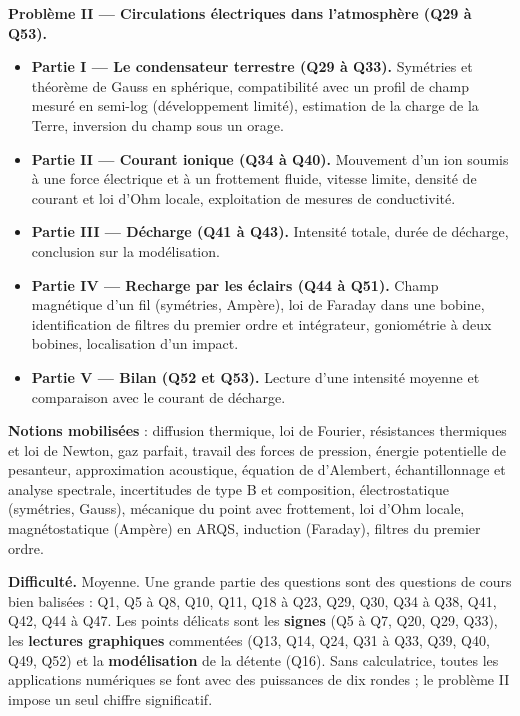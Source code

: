 \documentclass[11pt,a4paper]{article}
\providecommand{\tightlist}{\setlength{\itemsep}{0pt}\setlength{\parskip}{0pt}}
\begin{document}
\textbf{Problème II --- Circulations électriques dans l'atmosphère (Q29 à Q53).}

\begin{itemize}
\tightlist
\item
  \textbf{Partie I --- Le condensateur terrestre (Q29 à Q33).} Symétries et théorème de Gauss en sphérique, compatibilité avec un profil de champ mesuré en semi-log (développement limité), estimation de la charge de la Terre, inversion du champ sous un orage.
\item
  \textbf{Partie II --- Courant ionique (Q34 à Q40).} Mouvement d'un ion soumis à une force électrique et à un frottement fluide, vitesse limite, densité de courant et loi d'Ohm locale, exploitation de mesures de conductivité.
\item
  \textbf{Partie III --- Décharge (Q41 à Q43).} Intensité totale, durée de décharge, conclusion sur la modélisation.
\item
  \textbf{Partie IV --- Recharge par les éclairs (Q44 à Q51).} Champ magnétique d'un fil (symétries, Ampère), loi de Faraday dans une bobine, identification de filtres du premier ordre et intégrateur, goniométrie à deux bobines, localisation d'un impact.
\item
  \textbf{Partie V --- Bilan (Q52 et Q53).} Lecture d'une intensité moyenne et comparaison avec le courant de décharge.
\end{itemize}

\textbf{Notions mobilisées} : diffusion thermique, loi de Fourier, résistances thermiques et loi de Newton, gaz parfait, travail des forces de pression, énergie potentielle de pesanteur, approximation acoustique, équation de d'Alembert, échantillonnage et analyse spectrale, incertitudes de type B et composition, électrostatique (symétries, Gauss), mécanique du point avec frottement, loi d'Ohm locale, magnétostatique (Ampère) en ARQS, induction (Faraday), filtres du premier ordre.

\textbf{Difficulté.} Moyenne. Une grande partie des questions sont des questions de cours bien balisées : Q1, Q5 à Q8, Q10, Q11, Q18 à Q23, Q29, Q30, Q34 à Q38, Q41, Q42, Q44 à Q47. Les points délicats sont les \textbf{signes} (Q5 à Q7, Q20, Q29, Q33), les \textbf{lectures graphiques} commentées (Q13, Q14, Q24, Q31 à Q33, Q39, Q40, Q49, Q52) et la \textbf{modélisation} de la détente (Q16). Sans calculatrice, toutes les applications numériques se font avec des puissances de dix rondes ; le problème II impose un seul chiffre significatif.
\end{document}
